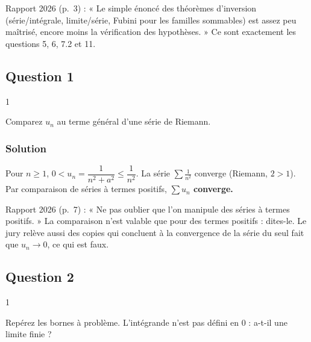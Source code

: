 \documentclass[11pt,a4paper]{article}
\begin{document}
\begin{jury}

Rapport 2026 (p.~3) : « Le simple énoncé des théorèmes d'inversion (série/intégrale, limite/série, Fubini pour les familles sommables) est assez peu maîtrisé, encore moins la vérification des hypothèses. » Ce sont exactement les questions 5, 6, 7.2 et 11.

\end{jury}

\hypertarget{question-1}{%
\subsection{Question 1}\label{question-1}}

\begin{indication}{1}

Comparez \(u_n\) au terme général d'une série de Riemann.

\end{indication}

\hypertarget{solution-11}{%
\subsubsection{Solution}\label{solution-11}}

Pour \(n\ge 1\), \(0<u_n=\dfrac{1}{n^2+a^2}\le\dfrac1{n^2}\). La série \(\sum\frac1{n^2}\) converge (Riemann, \(2>1\)). Par comparaison de séries à termes positifs, \textbf{\(\sum u_n\) converge.}

\begin{jury}

Rapport 2026 (p.~7) : « Ne pas oublier que l'on manipule des séries à termes positifs. » La comparaison n'est valable que pour des termes positifs : dites-le. Le jury relève aussi des copies qui concluent à la convergence de la série du seul fait que \(u_n\to 0\), ce qui est faux.

\end{jury}

\hypertarget{question-2}{%
\subsection{Question 2}\label{question-2}}

\begin{indication}{1}

Repérez les bornes à problème. L'intégrande n'est pas défini en \(0\) : a-t-il une limite finie ?

\end{indication}
\end{document}
